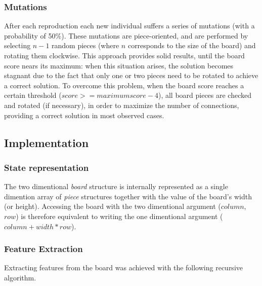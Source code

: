 \documentclass{llncs}
\begin{document}
\subsubsection{Mutations}\label{sec:mutations}

After each reproduction each new individual suffers a series of mutations (with a probability of 50\%). These mutations are piece-oriented, and are performed by selecting $n-1$ random pieces (where $n$ corresponds to the size of the board) and rotating them clockwise. This approach provides solid results, until the board score nears its maximum: when this situation arises, the solution becomes stagnant due to the fact that only one or two pieces need to be rotated to achieve a correct solution. To overcome this problem, when the board score reaches a certain threshold ($score >= maximum score - 4$), all board pieces are checked and rotated (if necessary), in order to maximize the number of connections, providing a correct solution in most observed cases.

\subsection{Implementation}\label{sec:implementation}

\subsubsection{State representation}\label{sec:state_representation}

The two dimentional \textit{board} structure is internally represented as a single dimention array of \textit{piece} structures together with the value of the board's width (or height). Accessing the board with the two dimentional argument ($column$, $row$) is therefore equivalent to writing the one dimentional argument ($column + width * row$).


\subsubsection{Feature Extraction}\label{sec:feature_extraction}

Extracting features from the board was achieved with the following recursive algorithm.
\end{document}
